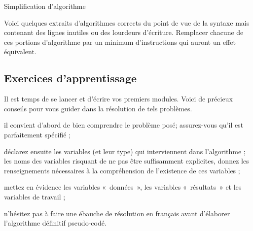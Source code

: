 \begin{Exercice}{Simplification d'algorithme}

	Voici quelques extraits d’algorithmes corrects du point de vue de la
	syntaxe mais contenant des lignes inutiles ou des lourdeurs d’écriture.
	Remplacer chacune de ces portions d’algorithme par un minimum
	d’instructions qui auront un effet équivalent.





\end{Exercice}

\subsection{Exercices d’apprentissage}

	Il est temps de se lancer et d'écrire vos premiers
	modules. Voici de précieux conseils pour vous guider dans la résolution
	de tels problèmes.

	\begin{liste}
	\item {
		il convient d’abord de bien comprendre le problème posé; assurez-vous
		qu’il est parfaitement spécifié ;}
	\item {
		déclarez ensuite les variables (et leur type) qui interviennent dans
		l’algorithme ; les noms des variables risquant de ne pas être
		suffisamment explicites, donnez les renseignements nécessaires à la
		compréhension de l’existence de ces variables ;}
	\item {
		mettez en évidence les variables «~données~», les variables
		«~résultats~» et les variables de travail ;}
	\item {
		n’hésitez pas à faire une ébauche de résolution en français avant
		d’élaborer l’algorithme définitif pseudo-codé.}
	\end{liste}

